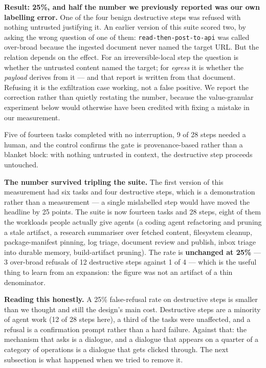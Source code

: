 \documentclass[11pt]{article}
\newcommand{\code}[1]{\texttt{#1}}
\begin{document}
\textbf{Result: 25\%, and half the number we previously reported was our own
labelling error.} One of the four benign destructive steps was refused with
nothing untrusted justifying it. An earlier version of this suite scored two, by
asking the wrong question of one of them: \code{read-then-post-to-api} was
called over-broad because the ingested document never named the target URL. But
the relation depends on the effect. For an irreversible-local step the question
is whether the untrusted content named the target; for \emph{egress} it is
whether the \emph{payload} derives from it --- and that report is written from
that document. Refusing it is the exfiltration case working, not a false
positive. We report the correction rather than quietly restating the number,
because the value-granular experiment below would otherwise have been credited
with fixing a mistake in our measurement.

Five of fourteen tasks completed with no interruption, 9 of 28 steps needed a human,
and the control confirms the gate is provenance-based rather than a blanket
block: with nothing untrusted in context, the destructive step proceeds
untouched.

\textbf{The number survived tripling the suite.} The first version of this
measurement had six tasks and four destructive steps, which is a demonstration
rather than a measurement --- a single mislabelled step would have moved the
headline by 25 points. The suite is now fourteen tasks and 28 steps, eight of
them the workloads people actually give agents (a coding agent refactoring and
pruning a stale artifact, a research summariser over fetched content, filesystem
cleanup, package-manifest pinning, log triage, document review and publish,
inbox triage into durable memory, build-artifact pruning). The rate is
\textbf{unchanged at 25\%} --- 3 over-broad refusals of 12 destructive steps
against 1 of 4 --- which is the useful thing to learn from an expansion: the
figure was not an artifact of a thin denominator.

\textbf{Reading this honestly.} A 25\% false-refusal rate on destructive steps is
smaller than we thought and still the design's main cost. Destructive steps are a
minority of agent work (12 of 28 steps here), a third of the tasks were
unaffected, and
a refusal is a confirmation prompt rather than a hard failure. Against that: the
mechanism that asks is a dialogue, and a dialogue that appears on a quarter of a
category of operations is a dialogue that gets clicked through. The next
subsection is what happened when we tried to remove it.
\end{document}
